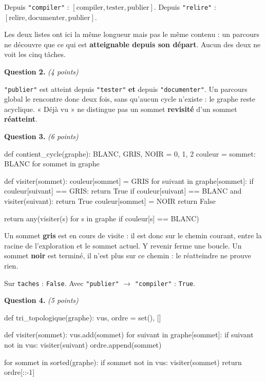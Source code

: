 Depuis \lstinline{"compiler"} : $[\text{compiler}, \text{tester},
\text{publier}]$. Depuis \lstinline{"relire"} : $[\text{relire},
\text{documenter}, \text{publier}]$.

Les deux listes ont ici la même longueur mais pas le même contenu : un parcours
ne découvre que ce qui est \textbf{atteignable depuis son départ}. Aucun des
deux ne voit les cinq tâches.

\medskip
\textbf{Question 2.} \emph{(4 points)}

\lstinline{"publier"} est atteint depuis \lstinline{"tester"} \textbf{et}
depuis \lstinline{"documenter"}. Un parcours global le rencontre donc deux
fois, sans qu'aucun cycle n'existe : le graphe reste acyclique. « Déjà vu » ne
distingue pas un sommet \textbf{revisité} d'un sommet \textbf{réatteint}.

\medskip
\textbf{Question 3.} \emph{(6 points)}

\begin{python}
def contient_cycle(graphe):
    BLANC, GRIS, NOIR = 0, 1, 2
    couleur = {sommet: BLANC for sommet in graphe}

    def visiter(sommet):
        couleur[sommet] = GRIS
        for suivant in graphe[sommet]:
            if couleur[suivant] == GRIS:
                return True
            if couleur[suivant] == BLANC and visiter(suivant):
                return True
        couleur[sommet] = NOIR
        return False

    return any(visiter(s) for s in graphe if couleur[s] == BLANC)
\end{python}

Un sommet \textbf{gris} est en cours de visite : il est donc sur le chemin
courant, entre la racine de l'exploration et le sommet actuel. Y revenir ferme
une boucle. Un sommet \textbf{noir} est terminé, il n'est plus sur ce chemin :
le réatteindre ne prouve rien.

Sur \lstinline{taches} : \lstinline{False}. Avec
\lstinline{"publier"} $\rightarrow$ \lstinline{"compiler"} : \lstinline{True}.

\medskip
\textbf{Question 4.} \emph{(5 points)}

\begin{python}
def tri_topologique(graphe):
    vus, ordre = set(), []

    def visiter(sommet):
        vus.add(sommet)
        for suivant in graphe[sommet]:
            if suivant not in vus:
                visiter(suivant)
        ordre.append(sommet)

    for sommet in sorted(graphe):
        if sommet not in vus:
            visiter(sommet)
    return ordre[::-1]
\end{python}


